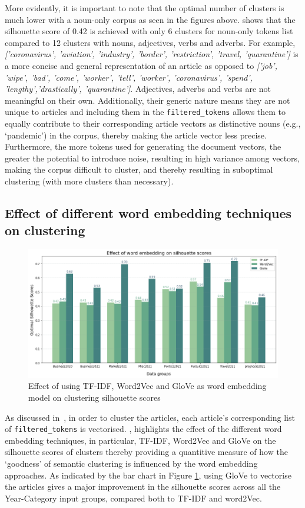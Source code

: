 More evidently, it is important to note that the optimal number of clusters is much lower with a noun-only corpus as seen in the figures above.  shows that the silhouette score of 0.42 is achieved with only 6 clusters for noun-only tokens list compared to 12 clusters with nouns, adjectives, verbs and adverbs. For example, \textit{['coronavirus', 'aviation', 'industry', 'border', 'restriction', 'travel, 'quarantine']} is a more concise and general representation of an article as opposed to \textit{['job', 'wipe', 'bad', 'come', 'worker', 'tell', 'worker', 'coronavirus', 'spend', 'lengthy','drastically', 'quarantine']}. Adjectives, adverbs and verbs are not meaningful on their own. Additionally, their generic nature means they are not unique to articles and including them in the \texttt{filtered\_tokens} allows them to equally contribute to their corresponding article vectors as distinctive nouns (e.g., `pandemic') in the corpus, thereby making the article vector less precise. Furthermore, the more tokens used for generating the document vectors, the greater the potential to introduce noise, resulting in high variance among vectors, making the corpus difficult to cluster, and thereby resulting in suboptimal clustering (with more clusters than necessary).

\subsection{Effect of different word embedding techniques on clustering} \label{s:word_embeddings}

\begin{figure}[H]
\centering
\includegraphics[width=0.7\linewidth]{images/eval/word_embedding.png}
\caption{Effect of using TF-IDF, Word2Vec and GloVe as word embedding model on clustering silhouette scores}
\label{fig:word_embed}
\end{figure}
\vspace{-1em}
As discussed in~, in order to cluster the articles, each article's corresponding list of \texttt{filtered\_tokens} is vectorised. , highlights the effect of the different word embedding techniques, in particular, TF-IDF, Word2Vec and GloVe on the silhouette scores of clusters thereby providing a quantitive measure of how the `goodness' of semantic clustering is influenced by the word embedding approaches. As indicated by the bar chart in Figure \ref{fig:word_embed}, using GloVe to vectorise the articles gives a major improvement in the silhouette scores across all the Year-Category input groups, compared both to TF-IDF and word2Vec.

